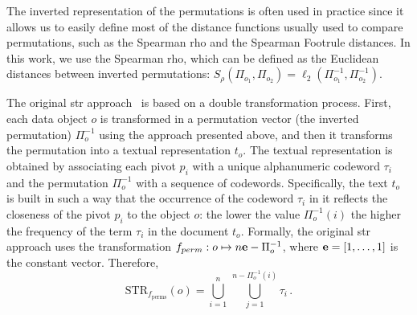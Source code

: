 The inverted representation of the permutations is often used in practice since it allows us to easily define most of the distance functions usually used to compare permutations, such as the Spearman rho and the Spearman Footrule distances.
In this work, we use the Spearman rho, which can be defined as the Euclidean distances between inverted permutations: $S_\rho (\Pi_{o_1},\Pi_{o_2})=\ell_2(\Pi^{-1}_{o_1},\Pi^{-1}_{o_2})$.

The original \gls{str} approach~\cite{gennaro2010approach} is based on a double transformation process.
First, each data object $o$ is transformed in a permutation vector (the inverted permutation) $\Pi^{-1}_{o}$ using the approach presented above, and then it transforms the permutation into a textual representation $t_o$.
The textual representation is obtained by associating each pivot $p_i$ with a unique alphanumeric codeword $\tau_i$ and the permutation $\Pi^{-1}_{o}$ with a sequence of codewords.
Specifically, the text $t_o$ is built in such a way that the occurrence of the codeword $\tau_i$ in it reflects the closeness of the pivot $p_i$ to the object $o$: the lower the value $\Pi^{-1}_{o}(i)$ the higher the frequency of the term $\tau_i$ in the document $t_o$.
Formally, the original \gls{str} approach uses the transformation
$
f_{perm} : o \mapsto n\e - \Pi^{-1}_{o} %
$,
where $\mathbf{e}=[1,\dots, 1]$ is the constant vector.
Therefore,
\begin{equation}
\text{STR}_{f_\text{perms}}(o) = \bigcup_{i=1}^n\, \bigcup_{j=1}^{n-\Pi^{-1}_{o}(i)} \tau_i \,.
\end{equation}

